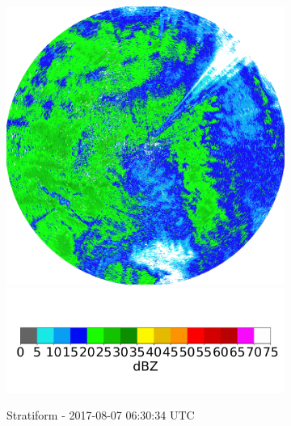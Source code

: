 \begin{figure}[h]
	\centering
	\begin{subfigure}[b]{0.45\textwidth}
		\includegraphics[width=\textwidth]{./thesis_code/plots/midlothian-tx-20170807-052557-ref-STRATIFORM.png}
		\includegraphics[width=\textwidth]{./thesis_code/plots/dfw_colormap.png}
		\caption{Stratiform - 2017-08-07 06:30:34 UTC}
		\label{fig:meteorology_stratiformexample}
	\end{subfigure}
	\begin{subfigure}[b]{0.45\textwidth}

\end{subfigure}
\end{figure}
